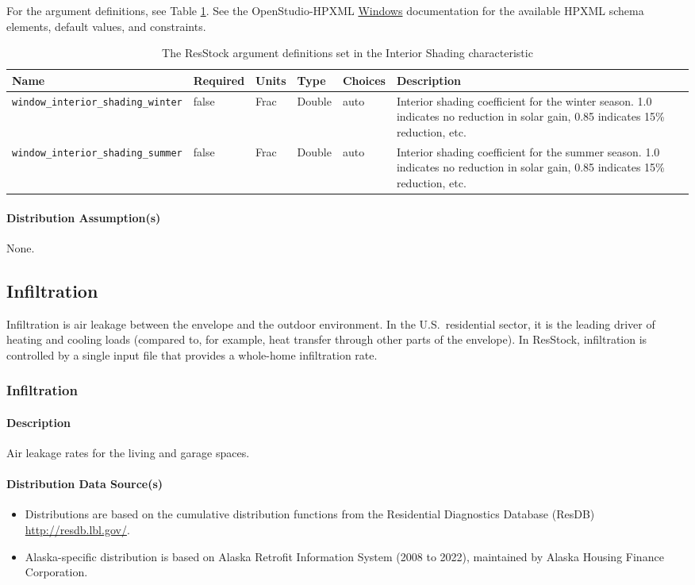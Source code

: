 For the argument definitions, see Table \ref{table:hc_arg_def_int_shad}. See the OpenStudio-HPXML \href{https://openstudio-hpxml.readthedocs.io/en/v1.8.1/workflow_inputs.html#hpxml-windows}{Windows} documentation for the available HPXML schema elements, default values, and constraints.
\begin{longtable}[]{|p{3.5cm}|p{1.5cm}|p{1.5cm}|p{1.5cm}|p{1.5cm}|p{}|} \caption{The ResStock argument definitions set in the Interior Shading characteristic} \label{table:hc_arg_def_int_shad} \\

\toprule\noalign{}
Name & Required & Units & Type & Choices & Description \\
\midrule\noalign{}
\endhead
\bottomrule\noalign{}
\endlastfoot
\texttt{window\_interior\_shading\_winter} & false & Frac & Double &
auto & Interior shading coefficient for the winter season. 1.0 indicates
no reduction in solar gain, 0.85 indicates 15\% reduction, etc. \\
\hline
\texttt{window\_interior\_shading\_summer} & false & Frac & Double &
auto & Interior shading coefficient for the summer season. 1.0 indicates
no reduction in solar gain, 0.85 indicates 15\% reduction, etc.  \\
\end{longtable}
\paragraph{Distribution Assumption(s)}
None. 
\subsection{Infiltration}
Infiltration is air leakage between the envelope and the outdoor environment. In the U.S.~residential sector, it is the leading driver of heating and cooling loads (compared to, for example, heat transfer through other parts of the envelope). In ResStock, infiltration is controlled by a single input file that provides a whole-home infiltration rate. 
\subsubsection{Infiltration}\label{infiltration}
\paragraph{Description}
Air leakage rates for the living and garage spaces.
\paragraph{Distribution Data Source(s)}
\begin{itemize}
 
\item
  Distributions are based on the cumulative distribution functions from
  the Residential Diagnostics Database (ResDB)
  \url{http://resdb.lbl.gov/}.
\item
  Alaska-specific distribution is based on Alaska Retrofit Information
  System (2008 to 2022), maintained by Alaska Housing Finance
  Corporation.
\end{itemize}



